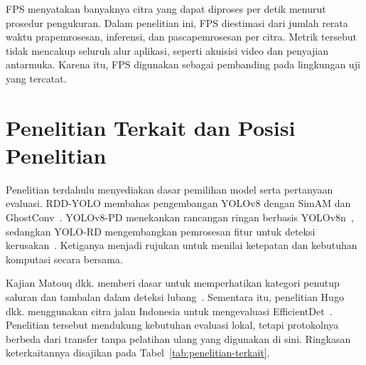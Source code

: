 FPS menyatakan banyaknya citra yang dapat diproses per detik menurut prosedur pengukuran. Dalam penelitian ini, FPS diestimasi dari jumlah rerata waktu prapemrosesan, inferensi, dan pascapemrosesan per citra. Metrik tersebut tidak mencakup seluruh alur aplikasi, seperti akuisisi video dan penyajian antarmuka. Karena itu, FPS digunakan sebagai pembanding pada lingkungan uji yang tercatat.

\section{Penelitian Terkait dan Posisi Penelitian}
Penelitian terdahulu menyediakan dasar pemilihan model serta pertanyaan evaluasi. RDD-YOLO membahas pengembangan YOLOv8 dengan SimAM dan GhostConv~\cite{Li2024}. YOLOv8-PD menekankan rancangan ringan berbasis YOLOv8n~\cite{Zeng2024}, sedangkan YOLO-RD mengembangkan pemrosesan fitur untuk deteksi kerusakan~\cite{Wang2025}. Ketiganya menjadi rujukan untuk menilai ketepatan dan kebutuhan komputasi secara bersama.

Kajian Matouq dkk. memberi dasar untuk memperhatikan kategori penutup saluran dan tambalan dalam deteksi lubang~\cite{matouq2024ai}. Sementara itu, penelitian Hugo dkk. menggunakan citra jalan Indonesia untuk mengevaluasi EfficientDet~\cite{hugo2025efficientdet}. Penelitian tersebut mendukung kebutuhan evaluasi lokal, tetapi protokolnya berbeda dari transfer tanpa pelatihan ulang yang digunakan di sini. Ringkasan keterkaitannya disajikan pada Tabel~\ref{tab:penelitian-terkait}.


